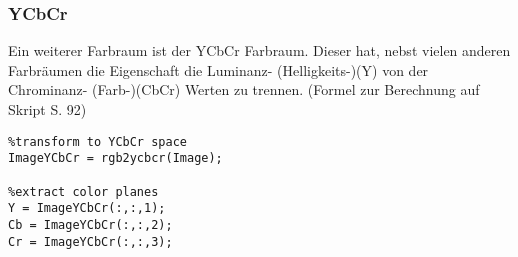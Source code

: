 \subsubsection{YCbCr}
Ein weiterer Farbraum ist der YCbCr Farbraum. Dieser hat, nebst vielen anderen Farbräumen die Eigenschaft die Luminanz- (Helligkeits-)(Y) von der Chrominanz- (Farb-)(CbCr) Werten zu trennen. (Formel zur Berechnung auf Skript S. 92)
\begin{lstlisting}
%transform to YCbCr space
ImageYCbCr = rgb2ycbcr(Image);

%extract color planes
Y = ImageYCbCr(:,:,1);
Cb = ImageYCbCr(:,:,2);
Cr = ImageYCbCr(:,:,3);
\end{lstlisting}